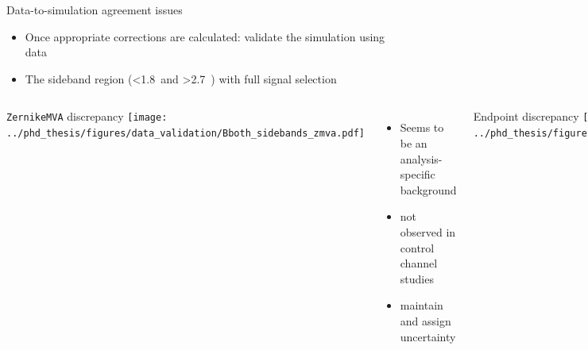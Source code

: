 \documentclass[xcolor=dvipsnames]{beamer}
\begin{document}



\begin{frame}{Data-to-simulation agreement issues}
   \scriptsize\centering
   \begin{itemize}
      \item Once appropriate corrections are calculated: validate the simulation using data
      \item The sideband region (\EB<1.8~\gev and \EB>2.7~\gev) with full signal selection
   \end{itemize}

   \begin{columns}
      \centering
      \texttt{ZernikeMVA} discrepancy
      \texttt{[image: ../phd\_thesis/figures/data\_validation/Bboth\_sidebands\_zmva.pdf]}
      
      \begin{itemize}
         \item Seems to be an analysis-specific background
         \item[\ra] not observed in control channel studies
         \item[\ra] maintain and assign uncertainty   
      \end{itemize}
      
      \Mbc Endpoint discrepancy
      \texttt{[image: ../phd\_thesis/figures/data\_validation/sidebands\_mbc\_nozmva\_1.pdf]}
      \begin{itemize}
         \item Related to the fact that data-taking period independent simulation used
         \item[\ra] correction and uncertainty applied
      \end{itemize}
  
   \end{columns}

\end{frame}
\end{document}
